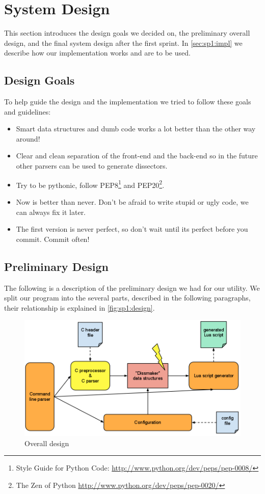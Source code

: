 \section{System Design}
This section introduces the design goals we decided on, the preliminary overall
design, and the final system design after the first sprint. In
\autoref{sec:sp1:impl} we describe how our implementation works and are to be
used.

\subsection{Design Goals}
To help guide the design and the implementation we tried to follow these
goals and guidelines:
\begin{itemize}
	\item Smart data structures and dumb code works a lot better than the other
		way around\cite{Raymond1999}!
	\item Clear and clean separation of the front-end and the back-end so in the
		future other parsers can be used to generate \glspl{dissector}.
	\item Try to be pythonic, follow
		PEP8\footnote{Style Guide for Python Code: \url{http://www.python.org/dev/peps/pep-0008/}} and
		PEP20\footnote{The Zen of Python \url{http://www.python.org/dev/peps/pep-0020/}}.
	\item Now is better than never. Don't be afraid to write stupid or ugly
		code, we can always fix it later.
	\item The first version is never perfect, so don't wait until its perfect
		before you commit. Commit often!
\end{itemize}

\subsection{Preliminary Design}
The following is a description of the preliminary design we had for our
\gls{utility}. We split our program into the several parts, described in the
following paragraphs, their relationship is explained in
\autoref{fig:sp1:design}.

\begin{figure}[!htb]
	\center
	\includegraphics[width=\textwidth]{./sprints/img/design}
	\caption{Overall design\label{fig:sp1:design}}
\end{figure}

